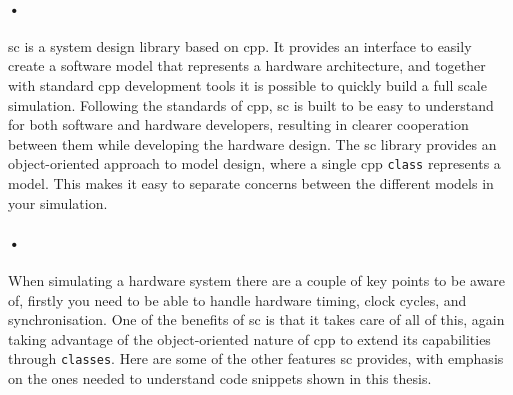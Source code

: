 \documentclass[a4paper, 12pt]{report}
\newcommand{\codeword}[1]{\texttt{#1}}
\begin{document}
\paragraph{•}
\gls{sc} is a system design library based on \gls{cpp}\cite{systemc}.
It provides an interface to easily create a software model that represents a hardware architecture, and together with standard \gls{cpp} development tools it is possible to quickly build a full scale simulation.
Following the standards of \gls{cpp}, \gls{sc} is built to be easy to understand for both software and hardware developers, resulting in clearer cooperation between them while developing the hardware design.
The \gls{sc} library provides an object-oriented approach to model design, where a single \gls{cpp} \codeword{class} represents a model.
This makes it easy to separate concerns between the different models in your simulation.

\paragraph{•}
When simulating a hardware system there are a couple of key points to be aware of, firstly you need to be able to handle hardware timing, clock cycles, and synchronisation.
One of the benefits of \gls{sc} is that it takes care of all of this, again taking advantage of the object-oriented nature of \gls{cpp} to extend its capabilities through \codeword{classes}.
Here are some of the other features \gls{sc} provides, with emphasis on the ones needed to understand code snippets shown in this thesis.
\end{document}
